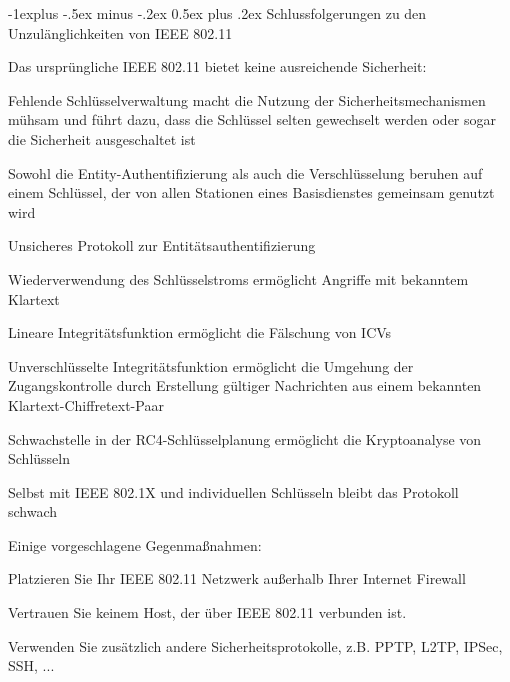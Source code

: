 \documentclass[a4paper]{article}
\makeatletter
\renewcommand{\subsection}{\@startsection{subsection}{2}{0mm}%
 {-1explus -.5ex minus -.2ex}%
 {0.5ex plus .2ex}%
 {\normalfont\normalsize\bfseries}}
\makeatother
\begin{document}
\begin{multicols}{3}
      \subsection{Schlussfolgerungen zu den Unzulänglichkeiten von IEEE 802.11}
      \begin{itemize*}
            \item Das ursprüngliche IEEE 802.11 bietet keine ausreichende Sicherheit:
            \begin{itemize*}
                  \item Fehlende Schlüsselverwaltung macht die Nutzung der Sicherheitsmechanismen mühsam und führt dazu, dass die Schlüssel selten gewechselt werden oder sogar die Sicherheit ausgeschaltet ist
                  \item Sowohl die Entity-Authentifizierung als auch die Verschlüsselung beruhen auf einem Schlüssel, der von allen Stationen eines Basisdienstes gemeinsam genutzt wird
                  \item Unsicheres Protokoll zur Entitätsauthentifizierung
                  \item Wiederverwendung des Schlüsselstroms ermöglicht Angriffe mit bekanntem Klartext
                  \item Lineare Integritätsfunktion ermöglicht die Fälschung von ICVs
                  \item Unverschlüsselte Integritätsfunktion ermöglicht die Umgehung der Zugangskontrolle durch Erstellung gültiger Nachrichten aus einem bekannten Klartext-Chiffretext-Paar
                  \item Schwachstelle in der RC4-Schlüsselplanung ermöglicht die Kryptoanalyse von Schlüsseln
            \end{itemize*}
            \item Selbst mit IEEE 802.1X und individuellen Schlüsseln bleibt das Protokoll schwach
            \item Einige vorgeschlagene Gegenmaßnahmen:
            \begin{itemize*}
                  \item Platzieren Sie Ihr IEEE 802.11 Netzwerk außerhalb Ihrer Internet Firewall
                  \item Vertrauen Sie keinem Host, der über IEEE 802.11 verbunden ist.
                  \item Verwenden Sie zusätzlich andere Sicherheitsprotokolle, z.B. PPTP, L2TP, IPSec, SSH, ...
            \end{itemize*}
      \end{itemize*}


\end{multicols}
\end{document}
